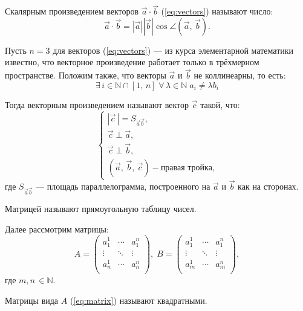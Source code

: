 Скалярным произведением векторов $\Vec{a} \cdot \Vec{b}$ (\ref{eq:vectors}) называют число:
\begin{equation}
    \Vec{a} \cdot \Vec{b} = \left|\Vec{a}\right|\left|\Vec{b}\right|\cos\angle\left(\Vec{a},\,\Vec{b}\right).
\end{equation}

Пусть $n = 3$ для векторов (\ref{eq:vectors}) --- из курса элементарной математики известно, что векторное произведение работает только в трёхмерном пространстве. Положим также, что векторы $\Vec{a}$ и $\Vec{b}$ не коллинеарны, то есть:
\begin{equation*}
    \exists\,i \in \mathbb{N}\cap\left[1,\,n\right]\;\forall\,\lambda\in\mathbb{N}\;a_i \neq \lambda b_i
\end{equation*}

Тогда векторным произведением называют вектор $\Vec{c}$ такой, что:
\begin{equation*}
    \begin{cases}
        \left|\Vec{c}\,\right| = S_{\Vec{a}\Vec{b}}, \\
        \Vec{c} \perp \Vec{a}, \\
        \Vec{c} \perp \Vec{b}, \\
        \left(\Vec{a},\,\Vec{b},\,\Vec{c}\right) - \textrm{правая тройка,}
    \end{cases}
\end{equation*}
где $S_{\Vec{a}\Vec{b}}$ --- площадь параллелограмма, построенного на $\Vec{a}$ и $\Vec{b}$ как на сторонах.

Матрицей называют прямоугольную таблицу чисел.

Далее рассмотрим матрицы:
\begin{equation}
    \label{eq:matrix}
    A = \begin{pmatrix} a_1^1 & \cdots & a_1^n \\ \vdots & \ddots & \vdots \\ a_n^1 & \cdots & a_n^n \\ \end{pmatrix},\;
    B = \begin{pmatrix} a_1^1 & \cdots & a_1^n \\ \vdots & \ddots & \vdots \\ a_m^1 & \cdots & a_m^n \\ \end{pmatrix},
\end{equation}
где $m,n\,\in\mathbb{N}$.

Матрицы вида $A$ (\ref{eq:matrix}) называют квадратными.

